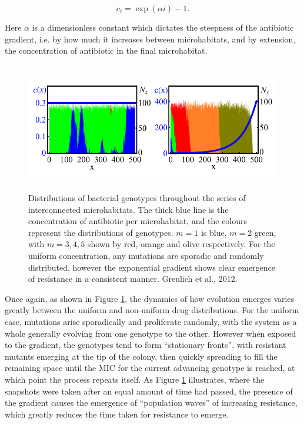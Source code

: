 \documentclass[a4paper,12pt]{article}
\begin{document}
\begin{equation}
 c_i = \exp(\alpha{i}) - 1.
 \label{eqn:c_i}
\end{equation}

Here $\alpha$ is a dimensionless constant which dictates the steepness of the antibiotic gradient, i.e. by how much it increases between microhabitats, and by extension, 
the concentration of antibiotic in the final microhabitat.


\begin{figure}[H]
 \centering
 \includegraphics[height=5.6cm]{greulich-geno-distbs}
 \caption{Distributions of bacterial genotypes throughout the series of interconnected microhabitats.  The thick blue line is the concentration of antibiotic per 
 microhabitat, and the colours represent the distributions of genotypes.  $m=1$ is blue, $m=2$ green, with $m=3, 4, 5$ shown by red, orange and olive respectively.  
 For the uniform concentration, any mutations are sporadic and randomly  distributed, however the exponential gradient shows clear emergence of resistance in a 
 consistent manner.  Greulich et al., 2012.}
 \label{fig:Greulich-geno-distbs}
\end{figure}

Once again, as shown in Figure \ref{fig:Greulich-geno-distbs}, the dynamics of how evolution emerges varies greatly between the uniform and non-uniform drug distributions.  
For the uniform case, mutations arise sporadically and proliferate randomly, with the system as a whole generally evolving from one genotype to the other.  However when 
exposed to the gradient, the genotypes tend to form ``stationary fronts'', with resistant mutants emerging at the tip of the colony, then quickly spreading to fill
the remaining space until the MIC for the current advancing genotype is reached, at which point the process repeats itself.  As Figure \ref{fig:Greulich-geno-distbs} 
illustrates, where the snapshots were taken after an equal amount of time had passed, the presence of the gradient causes the emergence of ``population waves'' of increasing 
resistance, which greatly reduces the time taken for resistance to emerge.
\end{document}
